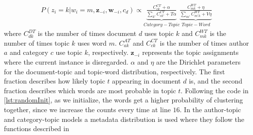 \begin{equation}\label{eq:category_gibbs_eq}
	\begin{split}
		P(z_i = k|w_i = m, \boldsymbol{z}_{-i}, \boldsymbol{w}_{-i}, c_d) \propto 
		\underbrace{\frac{C^{CT}_{ck} + \alpha}{\sum_{k'} C^{CT}_{ck'} + T\alpha}}_{Category-Topic}
		\underbrace{\frac{C^{WT}_{mk} + \eta}{\sum_{m'} C^{WT}_{m'k} + V\eta}}_{Topic-Word}
	\end{split}
\end{equation}
where $C^{DT}_{dk}$ is the number of times document $d$ uses topic $k$ and $C^{WT}_{mk}$ is the number of times topic $k$ uses word $m$.
$C^{AT}_{ak}$ and $C^{CT}_{ck}$ is the number of times author $a$ and category $c$ use topic $k$, respectively.
$\boldsymbol{z}_{-i}$ represents the topic assignments where the current instance is disregarded.
$\alpha$ and $\eta$ are the Dirichlet parameters for the document-topic and topic-word distribution, respectively.
The first fraction describes how likely topic $t$ appearing in document $d$ is, and the second fraction describes which words are most probable in topic $t$.
Following the code in \autoref{lst:randomInit}, as we initialize, the words get a higher probability of clustering together, since we increase the counts every time at line $16$.
In the author-topic and category-topic models a metadata distribution is used where they follow the functions described in 



